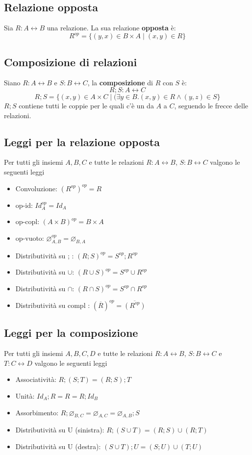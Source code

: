 \documentclass{article}
\begin{document}
\subsection*{Relazione opposta}
Sia \(R: A \leftrightarrow B\) una relazione. La sua relazione \textbf{opposta} è:
\[R^{op} = \{(y,x) \in B \times A \mid (x,y) \in R\}\]
\subsection*{Composizione di relazioni}
Siano \(R: A \leftrightarrow B\) e \(S: B \leftrightarrow C\), la \textbf{composizione} di \(R\) con \(S\) è:
\[R;S: A \leftrightarrow C\]
\[R;S = \{(x,y) \in A \times C \mid (\exists y \in B . (x,y) \in R \land (y,z) \in S\}\]
\(R;S\) contiene tutti le coppie per le quali c'è un  da \(A\) a \(C\), seguendo le frecce delle relazioni.
\subsection*{Leggi per la relazione opposta}
Per tutti gli insiemi \(A,B,C\) e tutte le relazioni \(R: A \leftrightarrow B\), \(S: B \leftrightarrow C\) valgono le seguenti leggi
\begin{itemize}
    \item Convoluzione: \((R^{op})^{op} = R\)
    \item op-id: \(Id_A^{op} = Id_A\)
    \item op-copl: \((A \times B)^{op} = B \times A\)
    \item op-vuoto: \(\varnothing_{A,B}^{op} = \varnothing_{B,A}\)
    \item Distributività su ; : \((R;S)^{op} = S^{op};R^{op}\)
    \item Distributività su \(\cup\): \((R \cup S)^{op} = S^{op} \cup R^{op}\)
    \item Distributività su \(\cap\): \((R \cap S)^{op} = S^{op} \cap R^{op}\)
    \item Distributività su compl : \((\overline{R})^{op} = \overline{(R^{op})}\)
\end{itemize}
\subsection*{Leggi per la composizione}
Per tutti gli insiemi \(A,B,C,D\) e tutte le relazioni \(R: A \leftrightarrow B\), \(S: B \leftrightarrow C\) e \(T: C \leftrightarrow D\) valgono le seguenti leggi
\begin{itemize}
    \item Associatività: \(R;(S;T) = (R;S);T\)
    \item Unità: \(Id_A;R = R = R;Id_B\)
    \item Assorbimento: \(R;\varnothing_{B,C} = \varnothing_{A,C} = \varnothing_{A,B};S\)
    \item Distributività su U (sinistra): \(R;(S \cup T) = (R;S) \cup (R;T)\)
    \item Distributività su U (destra): \((S \cup T);U = (S;U) \cup (T;U)\)
\end{itemize}
\end{document}
